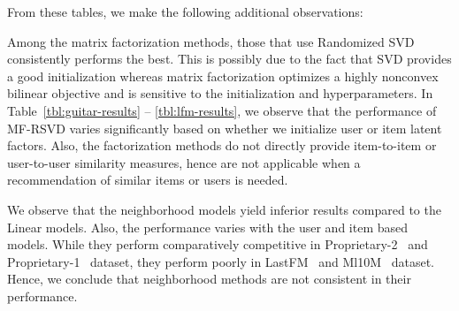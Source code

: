 \documentclass{article}
\newcommand{\citep}{\cite}
\newcommand{\MLens}{{\sc Ml10M }}
\newcommand{\LastFM}{{\sc LastFM }}
\newcommand{\Guitar}{{\sc Proprietary-1 }}
\newcommand{\Lowes}{{\sc Proprietary-2 }}
\begin{document}
From these tables, we make the following additional observations:
\begin{compactitem}

\item Among the matrix factorization methods, those that use Randomized SVD~\citep{Tang:2013} consistently performs the best. This is possibly due to the fact that SVD provides a good initialization
whereas matrix factorization optimizes a highly nonconvex bilinear objective and is sensitive to the initialization and hyperparameters. In Table~\ref{tbl:guitar-results} -- \ref{tbl:lfm-results}, we observe that the performance of MF-RSVD varies significantly based on whether we initialize user or item latent factors. Also, the factorization methods do not directly provide item-to-item or user-to-user similarity measures, hence are not applicable
when a recommendation of similar items or users is needed.
\item We observe that the neighborhood models yield inferior results compared to the Linear models. Also, the performance varies with the user and item based models. While they perform comparatively competitive in \Lowes\ and \Guitar\ dataset, they perform poorly in \LastFM\ and \MLens\ dataset. Hence, we conclude that neighborhood methods are not consistent in their performance.
\end{compactitem}
%
\end{document}

